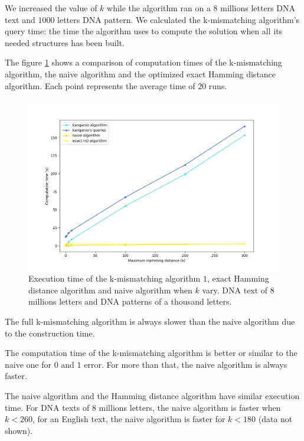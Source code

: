 \documentclass[preprint,12pt]{elsarticle}
\begin{document}
We increased the value of $k$ 
while the algorithm ran on a $8$ millions letters DNA text and $1 000$ letters DNA pattern.
We calculated the k-mismatching algorithm's query time:
the time the algorithm uses to compute the solution when all its needed structures has been built.

The figure \ref{Kang} shows a comparison of computation times of
the k-mismatching algorithm, the naive algorithm and the optimized exact Hamming distance algorithm.
Each point represents the average time of $20$ runs.

\begin{figure}[h]
\centering
\includegraphics[scale=0.6]{./figures/Kang.png}
\caption{
Execution time of the k-mismatching algorithm $1$, exact Hamming distance algorithm and naive algorithm
when $k$ vary.
DNA text of $8$ millions letters and DNA patterns of a thousand letters.
}
\label{Kang}
\end{figure}


The full k-mismatching algorithm is always slower than the naive algorithm due to the construction time.

The computation time of the k-mismatching algorithm is better or similar to the naive one for $0$ and $1$ error.
For more than that, the naive algorithm is always faster.

The naive algorithm and the Hamming distance algorithm have similar execution time.
For DNA texts of $8$ millions letters, the naive algorithm is faster when $k < 260$,
for an English text, the naive algorithm is faster for $k < 180$ (data not shown). 

\end{document}
